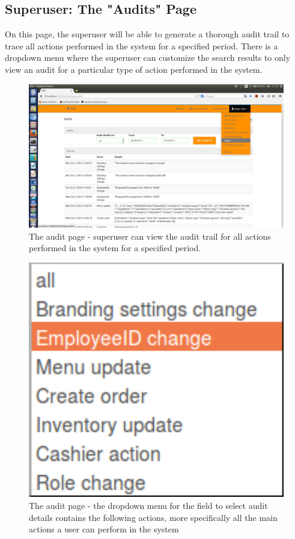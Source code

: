 \documentclass[a4paper,12pt]{report}
\begin{document}
\subsection{Superuser: The "Audits" Page} 
On this page, the superuser will be able to generate a thorough audit trail to trace all actions performed in the system for a specified period. There is a dropdown menu where the superuser can customize the search results to only view an audit for a particular type of action performed in the system.
\begin{figure}[H]
  \centering
    \includegraphics[width=1.0\textwidth]{screenshots/auditsAll.png}
    \caption{The audit page - superuser can view the audit trail for all actions performed in the system for a specified period. } 
\end{figure}

\begin{figure}[H]
  \centering
    \includegraphics[width=1.0\textwidth]{screenshots/Menu_001.png}
    \caption{The audit page - the dropdown menu for the field to select audit details contains the following actions, more specifically all the main actions a user can perform in the system} 
\end{figure}
\end{document}
